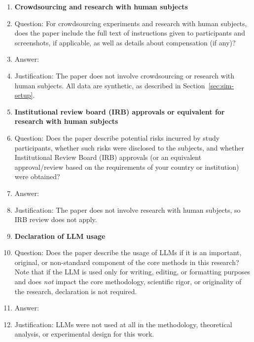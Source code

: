 \begin{enumerate}
\item {\bf Crowdsourcing and research with human subjects}
    \item[] Question: For crowdsourcing experiments and research with human subjects, does the paper include the full text of instructions given to participants and screenshots, if applicable, as well as details about compensation (if any)? 
    \item[] Answer: \answerNA{} %
    \item[] Justification: The paper does not involve crowdsourcing or research with human subjects. All data are synthetic, as described in Section~\ref{sec:sim-setup}.
    

\item {\bf Institutional review board (IRB) approvals or equivalent for research with human subjects}
    \item[] Question: Does the paper describe potential risks incurred by study participants, whether such risks were disclosed to the subjects, and whether Institutional Review Board (IRB) approvals (or an equivalent approval/review based on the requirements of your country or institution) were obtained?
    \item[] Answer: \answerNA{} %
    \item[] Justification: The paper does not involve research with human subjects, so IRB review does not apply.
  

\item {\bf Declaration of LLM usage}
    \item[] Question: Does the paper describe the usage of LLMs if it is an important, original, or non-standard component of the core methods in this research? Note that if the LLM is used only for writing, editing, or formatting purposes and does \emph{not} impact the core methodology, scientific rigor, or originality of the research, declaration is not required.
    \item[] Answer: \answerNA{} %
    \item[] Justification: LLMs were not used at all in the methodology, theoretical analysis, or experimental design for this work.
    
\end{enumerate}


